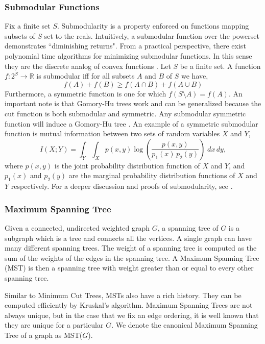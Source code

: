 \documentclass[twoside,11pt]{article}
\begin{document}
\subsubsection{Submodular Functions}
Fix a finite set $S$. Submodularity is a property enforced on functions mapping subsets of $S$ set to the reals.  Intuitively, a submodular function over the powerset demonstrates ``diminishing returns".  From a practical perspective, there exist polynomial time algorithms for minimizing submodular functions. In this sense they are the discrete analog of convex functions \citep{awesomesub}.
Let $S$ be a finite set.  A function $f\colon 2^S \to \mathbb{R}$ is submodular iff for all subsets $A$ and $B$ of $S$ we have,
$$f(A)+f(B) \geq f(A \cap B) + f(A \cup B)$$
Furthermore, a symmetric function is one for which $f(S \setminus A) = f(A)$. An important note is that Gomory-Hu trees work and can be generalized because the cut function is both submodular and symmetric. Any submodular symmetric function will induce a Gomory-Hu tree \citep{schrijver2003combinatorial}. An example of a symmetric submodular function is mutual information between two sets of random variables $X$ and $Y$,
$$ I(X;Y) = \int_Y \int_X p(x,y) \log{ \left( \frac{p(x,y)}{p_1(x)\,p_2(y)} \right) } \; dx \,dy,$$
 where $p(x,y)$ is the joint probability distribution function of $X$ and $Y$, and $p_1(x)$ and $p_2(y)$ are the marginal probability distribution functions of $X$ and $Y$ respectively. For a deeper discussion and proofs of submodularity, see \cite{toshev2010submodular}.

\subsubsection{Maximum Spanning Tree}

Given a connected, undirected weighted graph $G$, a spanning tree of $G$ is a subgraph which is a tree and connects all the vertices. A single graph can have many different spanning trees. The weight of a spanning tree is computed as the sum of the weights of the edges in the spanning tree. A Maximum Spanning Tree (MST) is then a spanning tree with weight greater than or equal to every other spanning tree.

Similar to Minimum Cut Trees, MSTs also have a rich history. They can be computed efficiently by Kruskal's algorithm. Maximum Spanning Trees are not always unique, but in the case that we fix an edge ordering, it is well known that they are unique for a particular $G$. We denote the canonical Maximum Spanning Tree of a graph as MST($G$).
\end{document}
